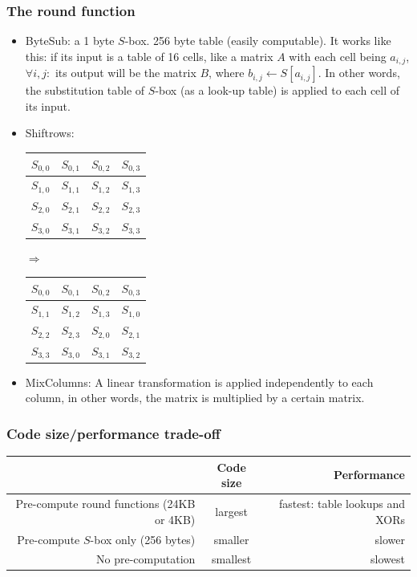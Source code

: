 \documentclass[12pt]{book}
\begin{document}
\subsubsection{The round function}
\begin{itemize}
	\item ByteSub: a 1 byte $S$-box. 256 byte table (easily computable). It works like this: if its input is a table of 16 cells, like a matrix $A$ with each cell being $a_{i,j}$, $\forall i,j:$ its output will be the matrix $B$, where $b_{i,j}\leftarrow S[a_{i,j}]$. In other words, the substitution table of $S$-box (as a look-up table) is applied to each cell of its input.
	\item Shiftrows: \begin{tabular}{|c|c|c|c|}
		\hline
		$S_{0,0}$&$S_{0,1}$&$S_{0,2}$&$S_{0,3}$\\\hline
		$S_{1,0}$&$S_{1,1}$&$S_{1,2}$&$S_{1,3}$\\\hline
		$S_{2,0}$&$S_{2,1}$&$S_{2,2}$&$S_{2,3}$\\\hline
		$S_{3,0}$&$S_{3,1}$&$S_{3,2}$&$S_{3,3}$\\\hline
	\end{tabular} $\Longrightarrow$ \begin{tabular}{|c|c|c|c|}
		\hline
		$S_{0,0}$&$S_{0,1}$&$S_{0,2}$&$S_{0,3}$\\\hline
		$S_{1,1}$&$S_{1,2}$&$S_{1,3}$&$S_{1,0}$\\\hline
		$S_{2,2}$&$S_{2,3}$&$S_{2,0}$&$S_{2,1}$\\\hline
		$S_{3,3}$&$S_{3,0}$&$S_{3,1}$&$S_{3,2}$\\\hline
	\end{tabular}
	\item MixColumns: A linear transformation is applied independently to each column, in other words, the matrix is multiplied by a certain matrix.
\end{itemize}

\subsubsection{Code size/performance trade-off}
\begin{center}
	\begin{tabular}{N{.3}cN{.2}}
		\hline
		&\textbf{Code size}&\textbf{Performance}\\\hline
		Pre-compute round functions (24KB or 4KB) & largest & fastest: table lookups and XORs\\
		Pre-compute $S$-box only (256 bytes) & smaller & slower\\
		No pre-computation & smallest & slowest\\\hline
	\end{tabular}
\end{center}
\end{document}
